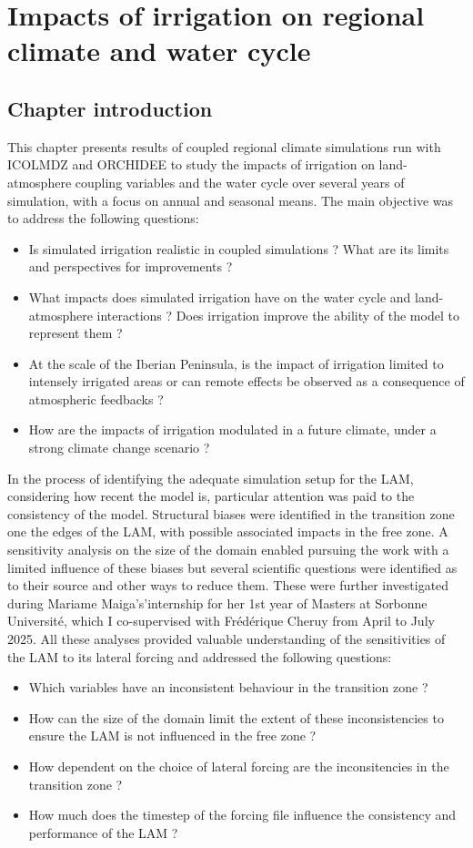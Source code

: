 \chapter{Impacts of irrigation on regional climate and water cycle}
\label{chap:monthly}
\minitoc
\pagebreak

\section{Chapter introduction}

This chapter presents results of coupled regional climate simulations run with ICOLMDZ and ORCHIDEE to study the impacts of irrigation on land-atmosphere coupling variables and the water cycle over several years of simulation, with a focus on annual and seasonal means. The main objective was to address the following questions:
\begin{itemize}
    \item Is simulated irrigation realistic in coupled simulations ? What are its limits and perspectives for improvements ?
    \item What impacts does simulated irrigation have on the water cycle and land-atmosphere interactions ? Does irrigation improve the ability of the model to represent them ?
    \item At the scale of the Iberian Peninsula, is the impact of irrigation limited to intensely irrigated areas or can remote effects be observed as a consequence of atmospheric feedbacks ?
    \item How are the impacts of irrigation modulated in a future climate, under a strong climate change scenario ?
\end{itemize}

In the process of identifying the adequate simulation setup for the LAM, considering how recent the model is, particular attention was paid to the consistency of the model. Structural biases were identified in the transition zone one the edges of the LAM, with possible associated impacts in the free zone. A sensitivity analysis on the size of the domain enabled pursuing the work with a limited influence of these biases but several scientific questions were identified as to their source and other ways to reduce them. These were further investigated during Mariame Maiga's'internship for her 1st year of Masters at Sorbonne Université, which I co-supervised with Frédérique Cheruy from April to July 2025. 
All these analyses provided valuable understanding of the sensitivities of the LAM to its lateral forcing and addressed the following questions: 
\begin{itemize}
    \item Which variables have an inconsistent behaviour in the transition zone ?
    \item How can the size of the domain limit the extent of these inconsistencies to ensure the LAM is not influenced in the free zone ?
    \item How dependent on the choice of lateral forcing are the inconsitencies in the transition zone ?
    \item How much does the timestep of the forcing file influence the consistency and performance of the LAM ?
\end{itemize}

